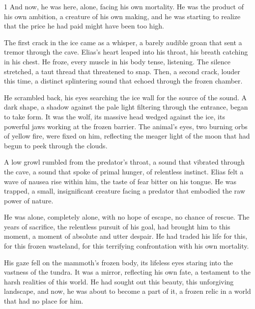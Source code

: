 \documentclass{article}
\newcommand{\Agentsroomzs}{\textsc{Agents' Room$_{ZS}$}}
\begin{document}
\begin{tcolorbox}[colback=white, colframe=gray!30!white, coltitle=black, parskip=5mm, title=
    \textbf{System output: \Agentsroomzs}, breakable]
\begin{spacing}{1}
And now, he was here, alone, facing his own mortality. He was the product of his own ambition, a creature of his own making, and he was starting to realize that the price he had paid might have been too high.\\\par

The first crack in the ice came as a whisper, a barely audible groan that sent a tremor through the cave. Elias's heart leaped into his throat, his breath catching in his chest. He froze, every muscle in his body tense, listening. The silence stretched, a taut thread that threatened to snap. Then, a second crack, louder this time, a distinct splintering sound that echoed through the frozen chamber.\\\par

He scrambled back, his eyes searching the ice wall for the source of the sound.  A dark shape, a shadow against the pale light filtering through the entrance, began to take form. It was the wolf, its massive head wedged against the ice, its powerful jaws working at the frozen barrier.  The animal's eyes, two burning orbs of yellow fire, were fixed on him, reflecting the meager light of the moon that had begun to peek through the clouds.\\\par

A low growl rumbled from the predator's throat, a sound that vibrated through the cave, a sound that spoke of primal hunger, of relentless instinct. Elias felt a wave of nausea rise within him, the taste of fear bitter on his tongue. He was trapped, a small, insignificant creature facing a predator that embodied the raw power of nature.
\\\par

He was alone, completely alone, with no hope of escape, no chance of rescue.  The years of sacrifice, the relentless pursuit of his goal, had brought him to this moment, a moment of absolute and utter despair.  He had traded his life for this, for this frozen wasteland, for this terrifying confrontation with his own mortality.\\\par

His gaze fell on the mammoth's frozen body, its lifeless eyes staring into the vastness of the tundra. It was a mirror, reflecting his own fate, a testament to the harsh realities of this world.  He had sought out this beauty, this unforgiving landscape, and now, he was about to become a part of it, a frozen relic in a world that had no place for him.\\\par


\end{spacing}
\end{tcolorbox}
\end{document}
